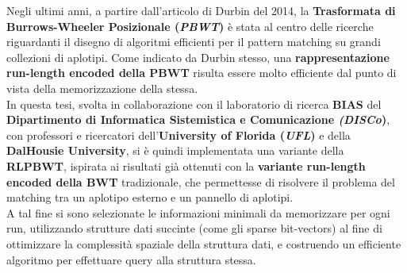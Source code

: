 Negli ultimi anni, a partire dall'articolo di Durbin del 2014, la
\textbf{Trasformata di Burrows-Wheeler Posizionale (\textit{PBWT})} è stata al
centro delle ricerche riguardanti 
il disegno di algoritmi efficienti per il pattern matching su grandi collezioni
di aplotipi. Come indicato da Durbin stesso, una \textbf{rappresentazione
  run-length encoded della PBWT} risulta essere molto efficiente dal punto di
vista della memorizzazione della stessa.\\
In questa tesi, svolta in collaborazione con il
laboratorio di ricerca \textbf{BIAS} del \textbf{Dipartimento di Informatica
  Sistemistica e Comunicazione \textit{(DISCo})}, con professori e ricercatori
dell'\textbf{University of Florida (\textit{UFL})} e della \textbf{DalHousie
  University}, si è quindi implementata una variante della \textbf{RLPBWT}, 
ispirata ai risultati già ottenuti con la \textbf{variante run-length encoded
  della BWT} tradizionale, che permettesse di risolvere il problema del matching
tra un aplotipo esterno e un pannello di aplotipi.\\
A tal fine si sono selezionate le
informazioni minimali da memorizzare per ogni run, utilizzando strutture dati
succinte (come gli sparse bit-vectors) al fine di ottimizzare la complessità
spaziale della struttura dati, e costruendo un efficiente algoritmo per
effettuare query alla struttura stessa. ​ 